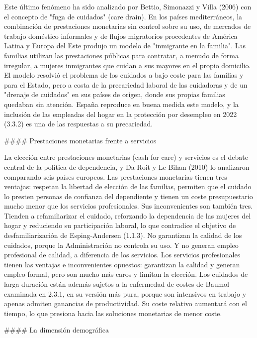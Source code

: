 \documentclass[10pt,a4paper]{article}
\begin{document}
Este último fenómeno ha sido analizado por Bettio, Simonazzi y Villa (2006) con el concepto de "fuga de cuidados" (care drain). En los países mediterráneos, la combinación de prestaciones monetarias sin control sobre su uso, de mercados de trabajo doméstico informales y de flujos migratorios procedentes de América Latina y Europa del Este produjo un modelo de "inmigrante en la familia". Las familias utilizan las prestaciones públicas para contratar, a menudo de forma irregular, a mujeres inmigrantes que cuidan a sus mayores en el propio domicilio. El modelo resolvió el problema de los cuidados a bajo coste para las familias y para el Estado, pero a costa de la precariedad laboral de las cuidadoras y de un "drenaje de cuidados" en sus países de origen, donde sus propias familias quedaban sin atención. España reproduce en buena medida este modelo, y la inclusión de las empleadas del hogar en la protección por desempleo en 2022 (3.3.2) es una de las respuestas a su precariedad.

#### Prestaciones monetarias frente a servicios

La elección entre prestaciones monetarias (cash for care) y servicios es el debate central de la política de dependencia, y Da Roit y Le Bihan (2010) lo analizaron comparando seis países europeos. Las prestaciones monetarias tienen tres ventajas: respetan la libertad de elección de las familias, permiten que el cuidado lo presten personas de confianza del dependiente y tienen un coste presupuestario mucho menor que los servicios profesionales. Sus inconvenientes son también tres. Tienden a refamiliarizar el cuidado, reforzando la dependencia de las mujeres del hogar y reduciendo su participación laboral, lo que contradice el objetivo de desfamiliarización de Esping-Andersen (1.1.3). No garantizan la calidad de los cuidados, porque la Administración no controla su uso. Y no generan empleo profesional de calidad, a diferencia de los servicios. Los servicios profesionales tienen las ventajas e inconvenientes opuestos: garantizan la calidad y generan empleo formal, pero son mucho más caros y limitan la elección. Los cuidados de larga duración están además sujetos a la enfermedad de costes de Baumol examinada en 2.3.1, en su versión más pura, porque son intensivos en trabajo y apenas admiten ganancias de productividad. Su coste relativo aumentará con el tiempo, lo que presiona hacia las soluciones monetarias de menor coste.

#### La dimensión demográfica
\end{document}
